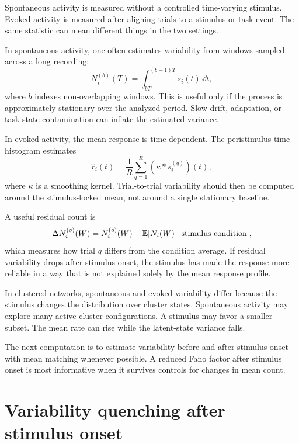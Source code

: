 Spontaneous activity is measured without a controlled time-varying stimulus. Evoked activity is measured after aligning trials to a stimulus or task event. The same statistic can mean different things in the two settings.

In spontaneous activity, one often estimates variability from windows sampled across a long recording:
%
\begin{equation}
  N_i^{(b)}(T)
  =
  \int_{bT}^{(b+1)T}s_i(t)\,\dd t ,
  \label{eq:spontaneous-window-counts}
\end{equation}
%
where $b$ indexes non-overlapping windows. This is useful only if the process is approximately stationary over the analyzed period. Slow drift, adaptation, or task-state contamination can inflate the estimated variance.

In evoked activity, the mean response is time dependent. The peristimulus time histogram estimates
%
\begin{equation}
  \widehat r_i(t)
  =
  \frac{1}{R}\sum_{q=1}^R
  (\kappa*s_i^{(q)})(t),
  \label{eq:psth-estimator}
\end{equation}
%
where $\kappa$ is a smoothing kernel. Trial-to-trial variability should then be computed around the stimulus-locked mean, not around a single stationary baseline.

A useful residual count is
%
\begin{equation}
  \Delta N_i^{(q)}(W)
  =
  N_i^{(q)}(W)
  -
  \mathbb{E}[N_i(W)\mid \text{stimulus condition}],
  \label{eq:evoked-residual-count}
\end{equation}
%
which measures how trial $q$ differs from the condition average. If residual variability drops after stimulus onset, the stimulus has made the response more reliable in a way that is not explained solely by the mean response profile.

In clustered networks, spontaneous and evoked variability differ because the stimulus changes the distribution over cluster states. Spontaneous activity may explore many active-cluster configurations. A stimulus may favor a smaller subset. The mean rate can rise while the latent-state variance falls.

The next computation is to estimate variability before and after stimulus onset with mean matching whenever possible. A reduced Fano factor after stimulus onset is most informative when it survives controls for changes in mean count.

\section{Variability quenching after stimulus onset}
\label{sec:variability-quenching-after-stimulus-onset}

